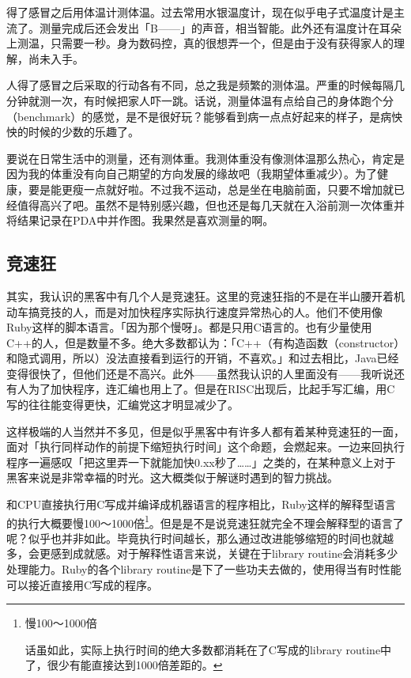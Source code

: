 \documentclass[a4paper,12pt]{article}
\begin{document}
得了感冒之后用体温计测体温。过去常用水银温度计，现在似乎电子式温度计是主流了。测量完成后还会发出「B——」的声音，相当智能。此外还有温度计在耳朵上测温，只需要一秒。身为数码控，真的很想弄一个，但是由于没有获得家人的理解，尚未入手。

人得了感冒之后采取的行动各有不同，总之我是频繁的测体温。严重的时候每隔几分钟就测一次，有时候把家人吓一跳。话说，测量体温有点给自己的身体跑个分（benchmark）的感觉，是不是很好玩？能够看到病一点点好起来的样子，是病怏怏的时候的少数的乐趣了。

要说在日常生活中的测量，还有测体重。我测体重没有像测体温那么热心，肯定是因为我的体重没有向自己期望的方向发展的缘故吧（我期望体重减少）。为了健康，要是能更瘦一点就好啦。不过我不运动，总是坐在电脑前面，只要不增加就已经值得高兴了吧。虽然不是特别感兴趣，但也还是每几天就在入浴前测一次体重并将结果记录在PDA中并作图。我果然是喜欢测量的啊。

\subsection{竞速狂}

其实，我认识的黑客中有几个人是竞速狂。这里的竞速狂指的不是在半山腰开着机动车搞竞技的人，而是对加快程序实际执行速度异常热心的人。他们不使用像Ruby这样的脚本语言。「因为那个慢呀」。都是只用C语言的。也有少量使用C++的人，但是数量不多。绝大多数都认为：「C++（有构造函数（constructor）和隐式调用，所以）没法直接看到运行的开销，不喜欢。」和过去相比，Java已经变得很快了，但他们还是不高兴。此外——虽然我认识的人里面没有——我听说还有人为了加快程序，连汇编也用上了。但是在RISC出现后，比起手写汇编，用C写的往往能变得更快，汇编党这才明显减少了。

这样极端的人当然并不多见，但是似乎黑客中有许多人都有着某种竞速狂的一面，面对「执行同样动作的前提下缩短执行时间」这个命题，会燃起来。一边来回执行程序一遍感叹「把这里弄一下就能加快0.xx秒了……」之类的，在某种意义上对于黑客来说是非常幸福的时光。这大概类似于解谜时遇到的智力挑战。

和CPU直接执行用C写成并编译成机器语言的程序相比，Ruby这样的解释型语言的执行大概要慢100～1000倍\footnote{慢100～1000倍

话虽如此，实际上执行时间的绝大多数都消耗在了C写成的library routine中了，很少有能直接达到1000倍差距的。}。但是是不是说竞速狂就完全不理会解释型的语言了呢？似乎也并非如此。毕竟执行时间越长，那么通过改进能够缩短的时间也就越多，会更感到成就感。对于解释性语言来说，关键在于library routine会消耗多少处理能力。Ruby的各个library routine是下了一些功夫去做的，使用得当有时性能可以接近直接用C写成的程序。
\end{document}
